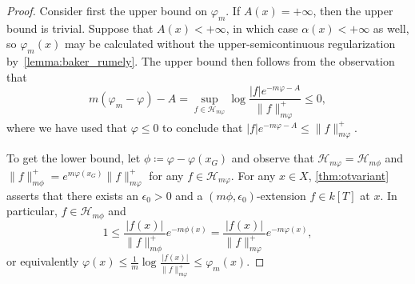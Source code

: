 \documentclass[10pt,reqno]{amsart}
\theoremstyle{plain}
\theoremstyle{definition}
\renewcommand{\H}{\mathcal{H}}
\numberwithin{equation}{section}
\DeclareMathOperator{\rig}{rig}
\begin{document}
\begin{proof}
Consider first the upper bound on $\varphi_m$.
If $A(x) = +\infty$, then the upper bound is trivial.
Suppose that $A(x) < +\infty$, in which case $\alpha(x) < +\infty$ as well, so $\varphi_m(x)$ may be calculated without the upper-semicontinuous regularization by~\cref{lemma:baker_rumely}.
The upper bound then follows from the observation that
$$
m(\varphi_m - \varphi) - A = \sup_{f \in \H_{m\varphi}} \log \frac{|f|e^{-m\varphi-A}}{\| f \|^+_{m\varphi}} \leq 0,
$$
where we have used that $\varphi \leq 0$ to conclude that $|f|e^{-m\varphi - A} \leq \| f \|^+_{m\varphi}$. 

To get the lower bound, let $\phi \coloneqq \varphi - \varphi(x_G)$ and observe that $\H_{m\varphi} = \H_{m\phi}$ and $\| f \|^+_{m\phi} = e^{m\varphi(x_G)} \| f \|^+_{m\varphi}$ for any $f \in \H_{m\varphi}$. 
For any $x \in X$, \cref{thm:otvariant} asserts that there exists an $\epsilon_0 > 0$ and a $(m\phi,\epsilon_0)$-extension $f \in k[T]$ at $x$. In particular, $f \in \H_{m\phi}$ and 
$$
1 \leq \frac{|f(x)|}{\| f \|^+_{m\phi}} e^{-m\phi(x)} = \frac{|f(x)|}{\| f \|^+_{m\varphi}} e^{-m\varphi(x)},
$$
or equivalently $\varphi(x) \leq \frac{1}{m} \log \frac{|f(x)|}{\| f \|^+_{m\varphi}} \leq \varphi_m(x)$.
\end{proof}
\end{document}
